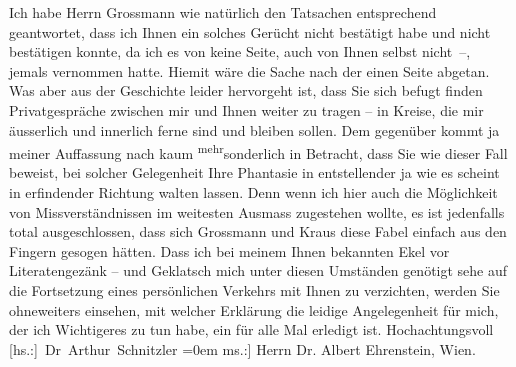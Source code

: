 \begin{ledgroupsized}[t]{13cm}
           \pstart
           Ich habe Herrn Grossmann wie natürlich den
                    Tatsachen entsprechend geantwortet, dass ich Ihnen ein solches Gerücht nicht
                    bestätigt habe und nicht bestätigen konnte, da ich es von keine Seite, auch von
                    Ihnen selbst nicht –, jemals vernommen hatte. Hiemit wäre die Sache nach der
                    einen Seite abgetan. Was aber aus der Geschichte leider hervorgeht ist, dass Sie
                    sich befugt finden Privatge{\pb}spräche zwischen mir und Ihnen
                    weiter zu tragen – in Kreise, die mir äusserlich und innerlich ferne sind und
                    bleiben sollen. Dem gegenüber kommt ja meine\introOben{}r\introOben{}
                    Auffassung \introOben{}nach\introOben{} kaum \substVorne{}\textsuperscript{mehr}\substDazwischen{}sonderlich\substHinten{} in Betracht, dass Sie wie dieser Fall beweist, bei solcher Gelegenheit
                    Ihre Phantasie in entstellender ja wie es scheint in erfindender Richtung walten
                    lassen. Denn wenn ich hier auch die Möglichkeit von Missverständnissen im
                    weitesten Ausmass zugestehen wollte, es ist jedenfalls total ausgeschlossen,
                    dass sich Grossmann und Kraus diese Fabel einfach aus den Fingern gesogen hätten.
                    Dass ich bei meinem Ihnen bekannten Ekel vor Literatengezänk – und Geklatsch
                    mich unter diesen Umständen genötigt sehe auf die Fortsetzung eines persönlichen
                    Verkehrs mit Ihnen zu verzichten, werden Sie ohneweiters einsehen, mit welcher
                    Erklärung die leidige Angelegenheit für mich, der ich Wichtigeres zu tun habe,
                    ein für alle Mal erledigt ist.\pend
           \pstart
           Hochachtungsvoll{\\[\baselineskip]}\spacefill\mbox{{[}hs.:{]} Dr Arthur Schnitzler}\pend
           \leftskip=0em{}\pstart
           \noindent{}{[}ms.:{]} Herrn Dr. Albert Ehrenstein, Wien.\pend
           \endnumbering{}\end{ledgroupsized}  \newcommand{\dateiname}{L02008}\newcommand{\titel}{Arthur Schnitzler an Albert Ehrenstein, 9. 2. 1911}\newcommand{\editorInnen}{Martin Anton Müller und Gerd-Hermann Susen}
      